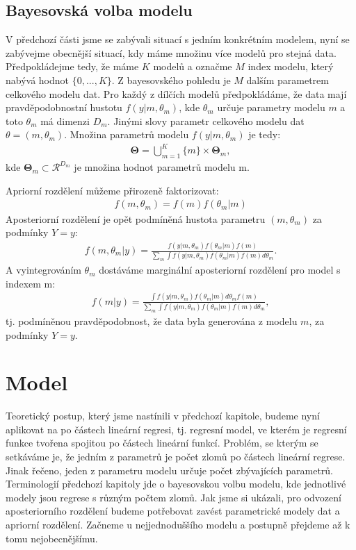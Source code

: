 \documentclass[czech,master,public,dept470,male,cpdeclaration,oneside, python]{diploma}
\begin{document}
\subsection{Bayesovská volba modelu}\label{model_choice}
V předchozí části jsme se zabývali situací s jedním konkrétním modelem, nyní se zabývejme obecnější situací, kdy máme množinu více modelů pro stejná data. Předpokládejme tedy, že máme $K$ modelů a označme $M$ index modelu, který nabývá hodnot $\{0, ..., K\}$. Z bayesovského pohledu je $M$ dalším parametrem celkového modelu dat. Pro každý z dílčích modelů předpokládáme, že data mají pravděpodobnostní hustotu $f(y |m,  \theta_m)$, kde $\theta_m$ určuje parametry modelu $m$ a toto $\theta_m$ má dimenzi $D_m$. Jinými slovy parametr celkového modelu dat $\theta = (m, \theta_m)$. Množina parametrů modelu $f(y |m,  \theta_m)$ je tedy:
\begin{align}\nonumber
\boldsymbol{\Theta} = \bigcup_{m=1}^{K} \{m\} \times \boldsymbol{\Theta}_m,
\end{align}
 kde $\boldsymbol{\Theta}_m \subset \mathcal{R}^{D_m}$ je množina hodnot parametrů modelu m. \par
Apriorní rozdělení můžeme přirozeně faktorizovat:
\begin{align}\nonumber
f(m, \theta_m) = f(m)f(\theta_m | m)
\end{align}
Aposteriorní rozdělení je opět podmíněná hustota parametru $(m, \theta_m)$ za podmínky $Y=y$:
\begin{align}\nonumber
f(m, \theta_m | y) = 
\frac{f(y | m, \theta_m)f(\theta_m | m)f(m)}{\sum_m \int f(y | m, \theta_m)f(\theta_m | m)f(m) d\theta_m}.
\end{align}
A vyintegrováním $\theta_m$ dostáváme marginální aposteriorní rozdělení pro model s indexem m:
\begin{align}\nonumber
f(m | y) =  \frac{\int f(y | m, \theta_m)f(\theta_m | m) d\theta_m f(m)}{\sum_m \int f(y | m, \theta_m)f(\theta_m | m)f(m) d\theta_m},
\end{align}
tj. podmíněnou pravděpodobnost, že data byla generována z modelu $m$, za podmínky $Y=y$.  

\section{Model}
Teoretický postup, který jsme nastínili v předchozí kapitole, budeme nyní aplikovat na po částech lineární regresi, tj. regresní model, ve kterém je regresní funkce tvořena spojitou po částech lineární funkcí. Problém, se kterým se setkáváme je, že jedním z parametrů je počet zlomů po částech lineární regrese. Jinak řečeno, jeden z parametru modelu určuje počet zbývajících parametrů. Terminologií předchozí kapitoly jde o bayesovskou volbu modelu, kde jednotlivé modely jsou regrese s různým počtem zlomů. Jak jsme si ukázali, pro odvození aposteriorního rozdělení budeme potřebovat zavést parametrické modely dat a apriorní rozdělení. Začneme u nejjednoduššího modelu a postupně přejdeme až k tomu nejobecnějšímu.
\par \par
\end{document}
